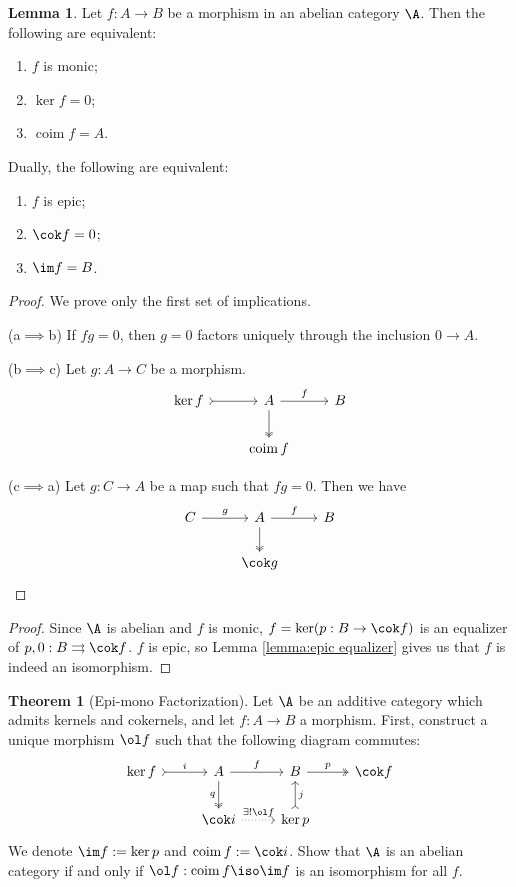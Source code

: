 \documentclass[12pt]{amsart}
\DeclareMathOperator{\coim}{coim}
\theoremstyle{definition}
\newtheorem{theorem}{Theorem}
\newtheorem{lemma}{Lemma}
\begin{document}
  \begin{lemma}
    \label{lemma:monic is trivial kernel}
    Let $f:A\to B$ be a morphism in an abelian category $\A$.
    Then the following are equivalent:
    \begin{enumerate}[label = (\alph*)]
      \item $f$ is monic;
      \item $\ker f=0$;
      \item $\coim f= A$.
    \end{enumerate}
    Dually, the following are equivalent:
    \begin{enumerate}[label = (\alph*')]
      \item $f$ is epic;
      \item $\cok f=0$;
      \item $\im f = B$.
    \end{enumerate}
  \end{lemma}

  \begin{proof}
    We prove only the first set of implications.

    (a$\implies$b) If $fg = 0$, then $g=0$ factors uniquely through the inclusion $0\to A$.

    (b$\implies$c) Let $g:A\to C$ be a morphism.
    \[
      \begin{tikzcd}
        \ker f\ar[r,tail] & A\ar[r,"f"]\ar[d,twoheadrightarrow]&B \\
                          &\coim f
      \end{tikzcd}
    \] 

    (c$\implies$a) Let $g:C\to A$ be a map such that $fg=0$.
    Then we have
    \[
      \begin{tikzcd}
        C\ar[r,"g"] & A\ar[r,"f"]\ar[d,twoheadrightarrow]&B \\
                          &\cok g
      \end{tikzcd}
    \] 
  \end{proof}

\begin{proof}
  Since $\A$ is abelian and $f$ is monic, $f=\ker(p:B\to \cok f)$ is an equalizer of $p,0:B\rightrightarrows\cok f$.
  $f$ is epic, so Lemma \ref{lemma:epic equalizer} gives us that $f$ is indeed an isomorphism.
\end{proof}

\begin{theorem}[Epi-mono Factorization]
  Let $\A$ be an additive category which admits kernels and cokernels, and let $f:A\to B$ a morphism.
  First, construct a unique morphism $\ol f$ such that the following diagram commutes:
  \[
    \begin{tikzcd}
      \ker f\ar[r,tail,"i"] & A\ar[d,twoheadrightarrow,"q"']\ar[r,"f"]
                            & B\ar[r,twoheadrightarrow, "p"] & \cok f \\
                            & \cok i\ar[r,dotted, "\exists! \ol f"] & \ker p\ar[u,tail,"j"']
    \end{tikzcd}
  \] 
  We denote $\im f:= \ker p$ and $\coim f:= \cok i$.
  Show that $\A$ is an abelian category if and only if $\ol f:\coim f\iso \im f$ is an isomorphism for all $f$.
\end{theorem}
\end{document}
